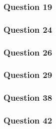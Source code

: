 \documentclass{article}
\begin{document}
\subsubsection{Question 19}
\subsubsection{Question 24}
\subsubsection{Question 26}
\subsubsection{Question 29}
\subsubsection{Question 38}
\subsubsection{Question 42}
\end{document}
